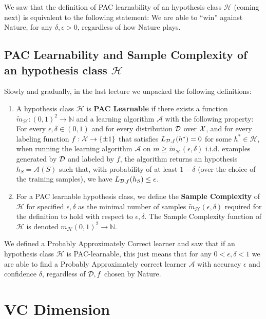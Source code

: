 \documentclass[11pt]{article}
\newcommand{\N}{\ensuremath{\mathbb{N}}}
\newcommand{\Ac}{\mathcal{A}}
\newcommand{\Hc}{\mathcal{H}}
\begin{document}
We saw that the definition of PAC learnability of an hypothesis class $\Hc$
(coming next) is equivalent to the following statement: We are able to ``win''
against Nature, for any $\delta,\epsilon>0$, regardless of how Nature plays.


\subsection*{PAC Learnability and Sample Complexity of an hypothesis class $\Hc$}

Slowly and gradually, in the last lecture we unpacked the following
definitions:

\begin{definition}
\begin{enumerate}
\item
A hypothesis class $\Hc$ is {\bf PAC Learnable} if there exists a function $\tilde{m}_\Hc : (0,1)^2 \to \N$ and a learning algorithm $\Ac$ with the following property:
For every $\epsilon,\delta \in (0,1)$ and for every distribution $\mathcal{D}$ over $\mathcal{X}$, and for every labeling function 
$f:\mathcal{X}\to\{\pm 1\}$ that satisfies $L_{\mathcal{D},f}(h^*)=0$ for some $h^*\in\Hc$, when running the learning algorithm $\Ac$ on $m\ge \tilde{m}_\Hc(\epsilon,\delta)$ i.i.d. examples generated by $\mathcal{D}$ and labeled by $f$, the algorithm returns an hypothesis $h_S=\Ac(S)$ such that, with probability of at least $1-\delta$ (over the choice of the training samples), we have
$
L_{\mathcal{D}, f}(h_S) \le \epsilon
$. 
\item For a PAC learnable hypothesis class, we define the {\bf Sample Complexity} of $\Hc$ for specified $\epsilon,\delta$ as the minimal number of samples $\tilde{m}_\Hc(\epsilon,\delta)$ required for the definition to hold with respect to $\epsilon,\delta$. The Sample Complexity function of $\Hc$ is denoted $m_\Hc(0,1)^2\to\mathbb{N}$.
\end{enumerate}
\end{definition}

We defined a Probably Approximately Correct learner and saw that if an
hypothesis class $\Hc$ is PAC-learnable, this just means that for any $0<\epsilon,
\delta<1$ we are able to
find a Probably Approximately correct learner $\Ac$ with accuracy $\epsilon$ and
confidence $\delta$, regardless of $\mathcal{D},f$ chosen by Nature. 


\section*{VC Dimension}
\end{document}
